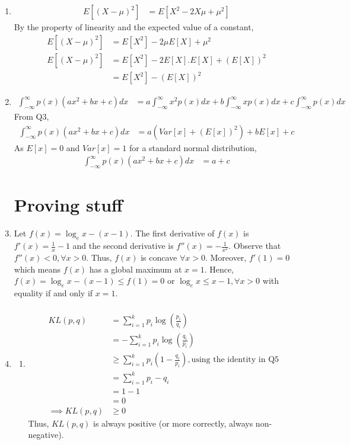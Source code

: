 \documentclass[11pt,english]{article}
\begin{document}
\begin{enumerate}
	\item \begin{align*}
	E[(X-\mu)^2] &= E[X^2 - 2X\mu + \mu^2]
		\end{align*} 
		By the property of linearity and the expected value of a constant,
			\begin{align*}
	E[(X-\mu)^2] &= E[X^2] - 2\mu E[X] + \mu^2 \\
	E[(X-\mu)^2] &= E[X^2] - 2E[X] . E[X] + (E[X])^2 \\
	&= E[X^2] - (E[X])^2
	\end{align*}
	\newpage
	
	\item \begin{align*}
	\int_{-\infty}^{\infty} p(x)(ax^2 + bx + c) dx &= a\int_{-\infty}^{\infty}x^2 p(x) dx + b\int_{-\infty}^{\infty} x p(x) dx + c\int_{-\infty}^{\infty} p(x) dx
	\end{align*}
	From Q3,
	\begin{align*}
	\int_{-\infty}^{\infty} p(x)(ax^2 + bx + c) dx &= a(Var[x] + (E[x])^2) + bE[x] + c
	\end{align*}
	As $E[x] = 0$ and $Var[x] = 1$ for a standard normal distribution,
	\begin{align*}
\int_{-\infty}^{\infty} p(x)(ax^2 + bx + c) dx &= a + c
	\end{align*}
	\newpage
	
\section{Proving stuff}	
	\item Let $f(x) = \log_e x - (x - 1)$. The first derivative of $f(x)$ is $f'(x) = \frac{1}{x} - 1$ and the second derivative is $f''(x) = -\frac{1}{x^2}$. Observe that $f''(x) < 0, \forall x > 0$. Thus, $f(x)$ is concave $\forall x > 0$. Moreover, $f'(1) = 0$ which means $f(x)$ has a global maximum at $x = 1$. Hence, $f(x) = \log_e x - (x - 1) \leq f(1) = 0$ or $\log_e x \leq x - 1, \forall x > 0$ with equality if and only if $x = 1$.
	\begin{align*}
	\end{align*}
	\newpage
	
	\item \begin{enumerate}[label=(\alph*)]
		\item \begin{align*}
		KL(p,q) &= \sum_{i=1}^k p_i \log\left(\frac{p_i}{q_i}\right) \\
		&= -\sum_{i=1}^k p_i \log\left(\frac{q_i}{p_i}\right) \\
		&\geq \sum_{i=1}^k p_i \left(1 - \frac{q_i}{p_i}\right), \text{using the identity in Q5} \\
		&= \sum_{i=1}^k p_i - q_i \\
		&= 1 - 1 \\
		&= 0 \\
		\implies KL(p,q) &\geq 0
		\end{align*}
		Thus, $KL(p,q)$ is always positive (or more correctly, always non-negative).
		\newpage
		

\end{enumerate}
\end{enumerate}
\end{document}
